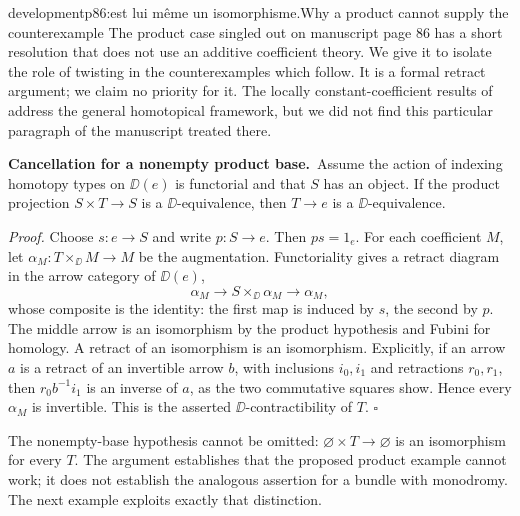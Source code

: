 \begin{dcomment}{development}{p86:est lui même un isomorphisme.}{Why a product cannot supply the counterexample}
The product case singled out on manuscript page 86 has a short resolution that does not use an additive coefficient theory. We give it to isolate the role of twisting in the counterexamples which follow. It is a formal retract argument; we claim no priority for it. The locally constant-coefficient results of \citet{Cisinski2009LocallyConstant} address the general homotopical framework, but we did not find this particular paragraph of the manuscript treated there.

\textbf{Cancellation for a nonempty product base.}\ours\
Assume the action of indexing homotopy types on $\DD(e)$ is functorial and that $S$ has an object. If the product projection $S\times T\to S$ is a $\DD$-equivalence, then $T\to e$ is a $\DD$-equivalence.

\emph{Proof.} Choose $s:e\to S$ and write $p:S\to e$. Then $ps=1_e$. For each coefficient $M$, let $\alpha_M:T\times_{\DD}M\to M$ be the augmentation. Functoriality gives a retract diagram in the arrow category of $\DD(e)$,
\[
 \alpha_M\longrightarrow S\times_{\DD}\alpha_M
                   \longrightarrow\alpha_M,
\]
whose composite is the identity: the first map is induced by $s$, the second by $p$. The middle arrow is an isomorphism by the product hypothesis and Fubini for homology. A retract of an isomorphism is an isomorphism. Explicitly, if an arrow $a$ is a retract of an invertible arrow $b$, with inclusions $i_0,i_1$ and retractions $r_0,r_1$, then $r_0b^{-1}i_1$ is an inverse of $a$, as the two commutative squares show. Hence every $\alpha_M$ is invertible. This is the asserted $\DD$-contractibility of $T$. \hfill$\square$

The nonempty-base hypothesis cannot be omitted: $\varnothing\times T\to\varnothing$ is an isomorphism for every $T$. The argument establishes that the proposed product example cannot work; it does not establish the analogous assertion for a bundle with monodromy. The next example exploits exactly that distinction.
\end{dcomment}

